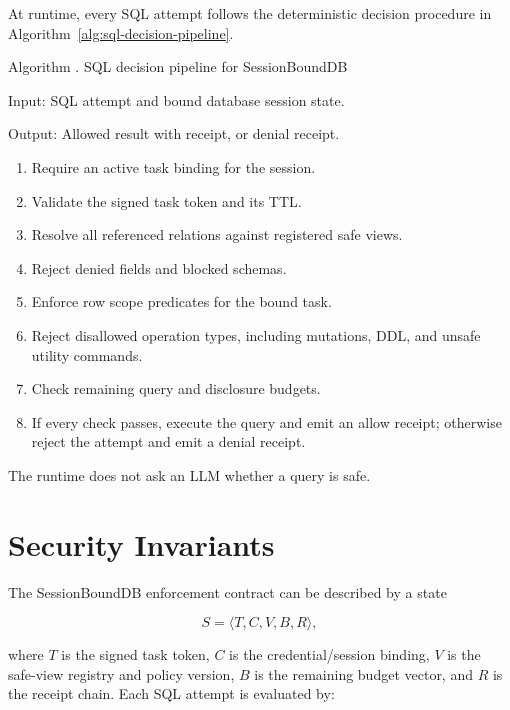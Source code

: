 \documentclass[journal]{IEEEtran}
\newcounter{algorithm}
\begin{document}
At runtime, every SQL attempt follows the deterministic decision
procedure in Algorithm~\ref{alg:sql-decision-pipeline}.

\begin{center}
\label{alg:sql-decision-pipeline}
\begin{minipage}{0.9\linewidth}
Algorithm \thealgorithm. SQL decision pipeline for SessionBoundDB

Input: SQL attempt and bound database session state.

Output: Allowed result with receipt, or denial receipt.

\begin{enumerate}
\item Require an active task binding for the session.
\item Validate the signed task token and its TTL.
\item Resolve all referenced relations against registered safe views.
\item Reject denied fields and blocked schemas.
\item Enforce row scope predicates for the bound task.
\item Reject disallowed operation types, including mutations, DDL, and
unsafe utility commands.
\item Check remaining query and disclosure budgets.
\item If every check passes, execute the query and emit an allow receipt;
otherwise reject the attempt and emit a denial receipt.
\end{enumerate}
\end{minipage}
\end{center}

The runtime does not ask an LLM whether a query is safe.


\hypertarget{security-invariants}{%
\section{Security Invariants}\label{security-invariants}}

The SessionBoundDB enforcement contract can be described by a state

\begin{equation}
S=\langle T,C,V,B,R\rangle,
\end{equation}

where \(T\) is the signed task token, \(C\) is the credential/session
binding, \(V\) is the safe-view registry and policy version, \(B\) is
the remaining budget vector, and \(R\) is the receipt chain. Each SQL
attempt is evaluated by:
\end{document}
